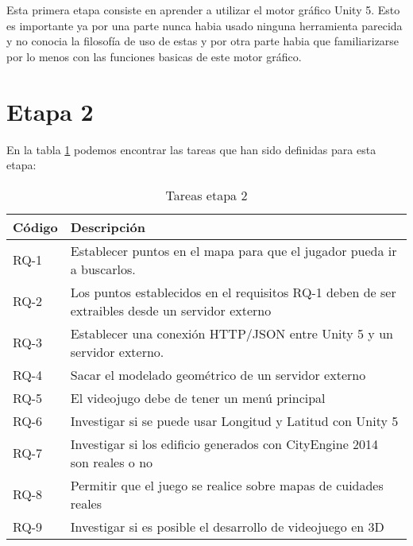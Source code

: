 Esta primera etapa consiste en aprender a utilizar el motor gráfico Unity 5. Esto es importante ya por una parte nunca habia usado ninguna herramienta parecida y no conocia la filosofía de uso de estas y por otra parte habia que familiarizarse por lo menos con las funciones basicas de este motor gráfico.

\section{Etapa 2}
\thispagestyle{empty}

En la tabla \ref{tabla:requisitosEtapa2} podemos encontrar las tareas que han sido definidas para esta etapa:

\begin{table}[H]
\begin{center}
\begin{tabular}{p{1.5cm}| p{10.5cm}}
\hline 
Código & Descripción \\
\hline \hline
RQ-1  & Establecer puntos en el mapa para que el jugador pueda ir a buscarlos. \\ \hline
RQ-2  & Los puntos establecidos en el requisitos RQ-1 deben de ser extraibles desde un servidor externo\\ \hline
RQ-3  & Establecer una conexión HTTP/JSON entre Unity 5 y un servidor externo. \\ \hline
RQ-4  & Sacar el modelado geométrico de un servidor externo \\ \hline
RQ-5  & El videojugo debe de tener un menú principal \\ \hline
RQ-6  & Investigar si se puede usar Longitud y Latitud con Unity 5 \\ \hline
RQ-7  & Investigar si los edificio generados con CityEngine 2014 son reales o no \\ \hline
RQ-8  & Permitir que el juego se realice sobre mapas de cuidades reales \\ \hline
RQ-9  & Investigar si es posible el desarrollo de videojuego en 3D \\ \hline
\end{tabular}
\caption{Tareas etapa 2}
\label{tabla:requisitosEtapa2}
\end{center}
\end{table}


